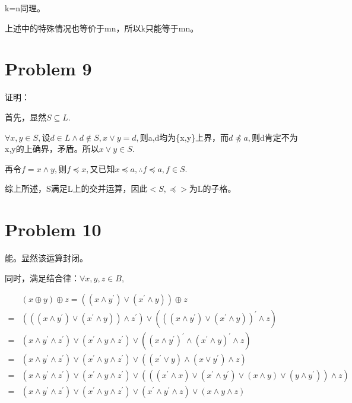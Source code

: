 \documentclass{article}
\begin{document}
k=n同理。

上述中的特殊情况也等价于mn，所以k只能等于mn。
\section*{Problem 9}
证明：

首先，显然$S\subseteq L.$

$\forall x,y\in S,$设$d\in L\wedge d\notin S,x\vee y=d,$则a,d均为\{x,y\}上界，而$d\npreceq a,$则d肯定不为x,y的上确界，矛盾。所以$x\vee y\in S.$

再令$f=x\wedge y,$则$f\preceq x,$又已知$x\preceq a,\therefore f\preceq a,f\in S.$

综上所述，S满足L上的交并运算，因此$<S,\preceq>$为L的子格。

\section*{Problem 10}
能。显然该运算封闭。

同时，满足结合律：$\forall x,y,z\in B,$

\begin{equation}
    \nonumber
    \begin{aligned}
        &(x \oplus y) \oplus z=\left(\left(x \wedge y^{\prime}\right) \vee\left(x^{\prime} \wedge y\right)\right) \oplus z \\
        =&\left(\left(\left(x \wedge y^{\prime}\right) \vee\left(x^{\prime} \wedge y\right)\right) \wedge z^{\prime}\right) \vee\left(\left(\left(x \wedge y^{\prime}\right) \vee\left(x^{\prime} \wedge y\right)\right)^{\prime} \wedge z\right) \\
        =&\left(x \wedge y^{\prime} \wedge z^{\prime}\right) \vee\left(x^{\prime} \wedge y \wedge z^{\prime}\right) \vee\left(\left(x \wedge y^{\prime}\right)^{\prime} \wedge\left(x^{\prime} \wedge y\right)^{\prime} \wedge z\right) \\
        =&\left(x \wedge y^{\prime} \wedge z^{\prime}\right) \vee\left(x^{\prime} \wedge y \wedge z^{\prime}\right) \vee\left(\left(x^{\prime} \vee y\right) \wedge\left(x \vee y^{\prime}\right) \wedge z\right) \\
        =&\left(x \wedge y^{\prime} \wedge z^{\prime}\right) \vee\left(x^{\prime} \wedge y \wedge z^{\prime}\right) \vee\left(\left(\left(x^{\prime} \wedge x\right) \vee\left(x^{\prime} \wedge y^{\prime}\right) \vee(x \wedge y) \vee\left(y \wedge y^{\prime}\right)\right) \wedge z\right) \\
        =&\left(x \wedge y^{\prime} \wedge z^{\prime}\right) \vee\left(x^{\prime} \wedge y \wedge z^{\prime}\right) \vee\left(x^{\prime} \wedge y^{\prime} \wedge z\right) \vee(x \wedge y \wedge z)
        \end{aligned}
\end{equation}
\end{document}
